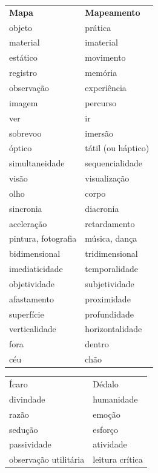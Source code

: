 \begin{table}[!htbp]
\begin{tabular}{ll}
\textbf{Mapa}         & \textbf{Mapeamento} \\
objeto                & prática             \\
material              & imaterial           \\
estático              & movimento           \\
registro              & memória             \\
observação            & experiência         \\
imagem                & percurso            \\
ver                   & ir                  \\
sobrevoo              & imersão             \\
óptico                & tátil (ou háptico)  \\
simultaneidade        & sequencialidade     \\
visão                 & visualização        \\
olho                  & corpo               \\
sincronia             & diacronia           \\
aceleração            & retardamento        \\
pintura, fotografia   & música, dança       \\
bidimensional         & tridimensional      \\
imediaticidade        & temporalidade       \\
objetividade          & subjetividade       \\
afastamento           & proximidade         \\
superfície            & profundidade        \\
verticalidade         & horizontalidade     \\
fora                  & dentro              \\
céu                   & chão                \\
\end{tabular}
\end{table}

\begin{table}[!htbp]
\begin{tabular}{ll}
Ícaro                 & \index{Dedalo@Dédalo}Dédalo              \\
divindade             & humanidade          \\
razão                 & emoção              \\
sedução               & esforço             \\
passividade           & atividade           \\
observação utilitária & leitura crítica    
\end{tabular}
\end{table}

